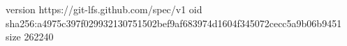 version https://git-lfs.github.com/spec/v1
oid sha256:a4975c397f029932130751502bef9af683974d1604f345072cecc5a9b06b9451
size 262240
